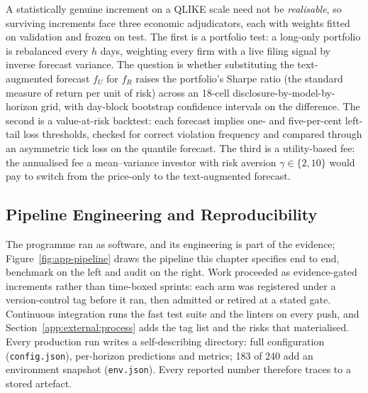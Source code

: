 A statistically genuine increment on a QLIKE scale need not be \emph{realisable}, so surviving increments face three economic adjudicators, each with weights fitted on validation and frozen on test. The first is a portfolio test: a long-only portfolio is rebalanced every $h$ days, weighting every firm with a live filing signal by inverse forecast variance. The question is whether substituting the text-augmented forecast $f_U$ for $f_R$ raises the portfolio's Sharpe ratio (the standard measure of return per unit of risk) across an 18-cell disclosure-by-model-by-horizon grid, with day-block bootstrap confidence intervals on the difference. %
The second is a value-at-risk backtest: each forecast implies one- and five-per-cent left-tail loss thresholds, checked for correct violation frequency and compared through an asymmetric tick loss on the quantile forecast. %
The third is a utility-based fee: the annualised fee a mean--variance investor with risk aversion $\gamma \in \{2, 10\}$ would pay to switch from the price-only to the text-augmented forecast. %

\subsection{Pipeline Engineering and Reproducibility}
\label{sec:design-engineering}

The programme ran as software, and its engineering is part of the evidence; Figure~\ref{fig:app-pipeline} draws the pipeline this chapter specifies end to end, benchmark on the left and audit on the right. Work proceeded as evidence-gated increments rather than time-boxed sprints: each arm was registered under a version-control tag before it ran, then admitted or retired at a stated gate. Continuous integration runs the fast test suite and the linters on every push, and Section~\ref{app:external:process} adds the tag list and the risks that materialised. Every production run writes a self-describing directory: full configuration (\texttt{config.json}), per-horizon predictions and metrics; 183 of 240 add an environment snapshot (\texttt{env.json}). Every reported number therefore traces to a stored artefact. %

